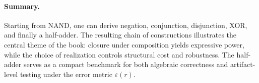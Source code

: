 \documentclass[11pt]{article}
\begin{document}
\paragraph{Summary.}
Starting from NAND, one can derive negation, conjunction, disjunction, XOR, and finally a half-adder. The resulting chain of constructions illustrates the central theme of the book: closure under composition yields expressive power, while the choice of realization controls structural cost and robustness. The half-adder serves as a compact benchmark for both algebraic correctness and artifact-level testing under the error metric \(\varepsilon(r)\).
\end{document}
